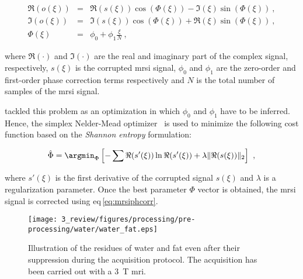 \begin{eqnarray}
	\Re(o(\xi)) & = & \Re(s(\xi))\cos(\Phi(\xi)) - \Im(\xi)\sin(\Phi(\xi)) \ , \nonumber  \\
	\Im(o(\xi)) & = & \Im(s(\xi))\cos(\Phi(\xi)) + \Re(\xi)\sin(\Phi(\xi)) \ , \nonumber \\
	\Phi(\xi) & = & \phi_0 + \phi_1 \frac{\xi}{N} \ , \label{eq:mrsiphcorr}
\end{eqnarray}

\noindent where $\Re(\cdot)$ and $\Im(\cdot)$ are the real and imaginary part of the complex signal, respectively, $s(\xi)$ is the corrupted \ac{mrsi} signal, $\phi_0$ and $\phi_1$ are the zero-order and first-order phase correction terms respectively and $N$ is the total number of samples of the \ac{mrsi} signal.

\citeauthor{Chen2002} tackled this problem as an optimization in which $\phi_0$ and $\phi_1$ have to be inferred.
Hence, the simplex Nelder-Mead optimizer~\cite{Nelder1965} is used to minimize the following cost function based on the \textit{Shannon entropy} formulation:

\begin{equation}
	\hat{\Phi} = \argmin_{\Phi} \left[ - \sum \Re(s'(\xi)) \ln \Re(s'(\xi)) + \lambda \|\Re(s(\xi))\|_2 \right] \ ,
	\label{eq:phcost}
\end{equation}

\noindent where $s'(\xi)$ is the first derivative of the corrupted signal $s(\xi)$ and $\lambda$ is a regularization parameter.
Once the best parameter $\Phi$ vector is obtained, the \ac{mrsi} signal is corrected using \acs{eq}\,\eqref{eq:mrsiphcorr}.

\begin{figure}
\centering
\texttt{[image: 3\_review/figures/processing/pre-processing/water/water\_fat.eps]}
\caption[Illustration of water and fat residues in \ac{mrsi} signal after suppression during acquisition.]{Illustration of the residues of water and fat even after their suppression during the acquisition protocol. The acquisition has been carried out with a \SI{3}{\tesla} \ac{mri}.}
\label{fig:waterfat}
\end{figure}

